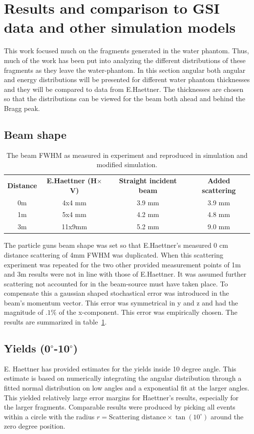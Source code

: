\clearpage
\section{Results and comparison to GSI data and other simulation models}

This work focused much on the fragments generated in the water phantom. Thus, much of the work has been put into analyzing the different distributions of these fragments as they leave the water-phantom. In this section angular both angular and energy distributions will be presented for different water phantom thicknesses and they will be compared to data from E.Haettner. The thicknesses are chosen so that the distributions can be viewed for the beam both ahead and behind the Bragg peak.

\subsection{Beam shape\label{beamShapeAnalysis}}
\begin{center}
 \begin{table}[!h]
\begin{tabular}{cccc} %
\textbf{Distance} & \textbf{E.Haettner (H$\times$V)} & \textbf{Straight incident beam} & \textbf{Added scattering} \\
0m &4x4 mm& 3.9 mm & 3.9 mm\\
1m &5x4 mm & 4.2 mm & 4.8 mm\\
3m &11x9mm& 5.2 mm & 9.0 mm\\
\end{tabular} 
\caption{\label{fig:beamFWHMtable} The beam FWHM as measured in experiment and reproduced in simulation and modified simulation.}
\end{table}
\end{center}
The particle guns beam shape was set so that E.Haettner's measured 0 cm distance scattering of 4mm FWHM was duplicated. When this scattering experiment was repeated for the two other provided measurement points of 1m and 3m results were not in line with those of E.Haettner. It was assumed further scattering not accounted for in the beam-source must have taken place. To compensate this a gaussian shaped stochastical error was introduced in the beam's momentum vector. This error was symmetrical in y and z and had the magnitude of $.1 \%$ of the x-component. This error was empirically chosen. The results are summarized in table~\ref{fig:beamFWHMtable}.


\subsection{Yields (0$^\circ$-10$^\circ$)}
E. Haettner has provided estimates for the yields inside 10 degree angle. This estimate is based on numerically integrating the angular distribution through a fitted normal distribution on low angles and a exponential fit at the larger angles. This yielded relatively large error margins for Haettner's results, especially for the larger fragments. Comparable results were produced by picking all events within a circle with the radius $r = \text{Scattering distance} \times \tan(10^{\circ})$ around the zero degree position.

